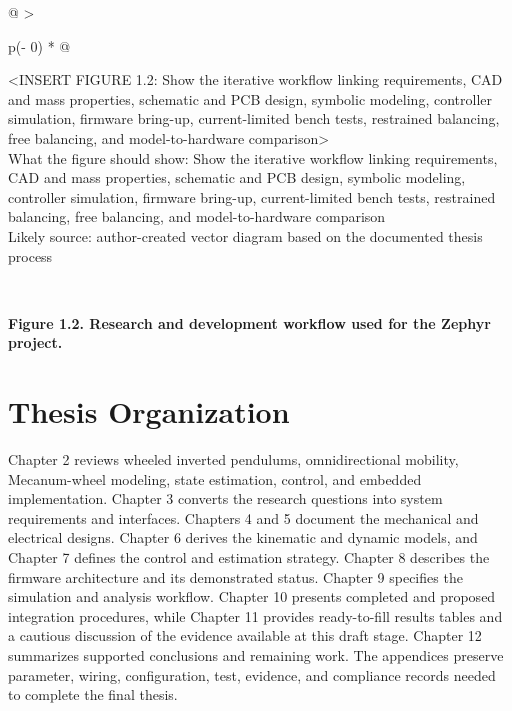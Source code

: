 \begin{longtable}[]{@{}
  >{\raggedright\arraybackslash}p{(\columnwidth - 0\tabcolsep) * }@{}}
\toprule\noalign{}
\begin{minipage}[b]{\linewidth}\raggedright
\textless INSERT FIGURE 1.2: Show the iterative workflow linking
requirements, CAD and mass properties, schematic and PCB design,
symbolic modeling, controller simulation, firmware bring-up,
current-limited bench tests, restrained balancing, free balancing, and
model-to-hardware comparison\textgreater{}\\
What the figure should show: Show the iterative workflow linking
requirements, CAD and mass properties, schematic and PCB design,
symbolic modeling, controller simulation, firmware bring-up,
current-limited bench tests, restrained balancing, free balancing, and
model-to-hardware comparison\\
Likely source: author-created vector diagram based on the documented
thesis process\strut
\end{minipage} \\
\midrule\noalign{}
\endhead
\bottomrule\noalign{}
\endlastfoot
\end{longtable}

\begin{center}\singlespacing
{}
\textbf{Figure 1.2. Research and development workflow used for the Zephyr project.}
\end{center}

\section{Thesis Organization}\label{thesis-organization}

Chapter 2 reviews wheeled inverted pendulums, omnidirectional mobility,
Mecanum-wheel modeling, state estimation, control, and embedded
implementation. Chapter 3 converts the research questions into system
requirements and interfaces. Chapters 4 and 5 document the mechanical
and electrical designs. Chapter 6 derives the kinematic and dynamic
models, and Chapter 7 defines the control and estimation strategy.
Chapter 8 describes the firmware architecture and its demonstrated
status. Chapter 9 specifies the simulation and analysis workflow.
Chapter 10 presents completed and proposed integration procedures, while
Chapter 11 provides ready-to-fill results tables and a cautious
discussion of the evidence available at this draft stage. Chapter 12
summarizes supported conclusions and remaining work. The appendices
preserve parameter, wiring, configuration, test, evidence, and
compliance records needed to complete the final thesis.
